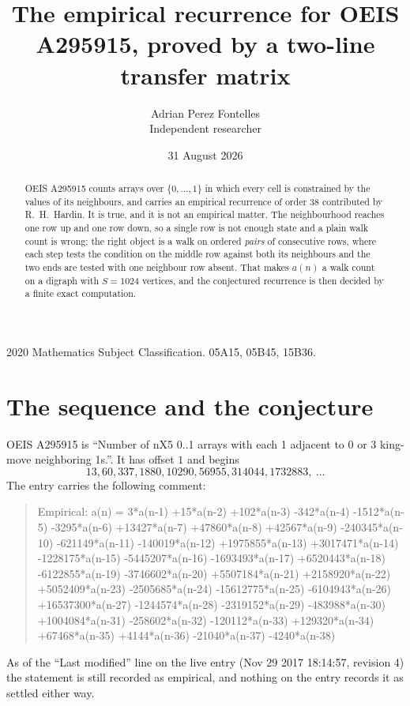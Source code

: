 \documentclass[11pt,a4paper]{article}
\title{The empirical recurrence for OEIS A295915, proved by a two-line transfer matrix}
\author{Adrian Perez Fontelles\\ \small Independent researcher}
\date{31 August 2026}
\theoremstyle{plain}
\theoremstyle{definition}
\begin{document}
\maketitle

\begin{abstract}
OEIS A295915 counts arrays over $\{0,\dots,1\}$ in which every cell is constrained by the
values of its neighbours, and carries an empirical recurrence of order $38$ contributed
by R.~H.~Hardin. It is true, and it is not an empirical matter. The neighbourhood reaches one
row up and one row down, so a single row is not enough state and a plain walk count
is wrong; the right object is a walk on ordered \emph{pairs} of consecutive rows, where
each step tests the condition on the middle row against both its neighbours and the two
ends are tested with one neighbour row absent. That makes $a(n)$ a walk count on a digraph
with $S=1024$ vertices, and the conjectured recurrence is then decided by a finite exact
computation.
\end{abstract}

\noindent\small 2020 Mathematics Subject Classification. 05A15, 05B45, 15B36.\normalsize

\section{The sequence and the conjecture}

OEIS A295915 is ``Number of nX5 0..1 arrays with each 1 adjacent to 0 or 3 king-move neighboring 1s.''. It has offset $1$ and begins
\[
13, 60, 337, 1880, 10290, 56955, 314044, 1732883,\ \dots
\]
The entry carries the following comment:
\begin{quote}\small
Empirical: a(n) = 3*a(n-1) +15*a(n-2) +102*a(n-3) -342*a(n-4) -1512*a(n-5) -3295*a(n-6) +13427*a(n-7) +47860*a(n-8) +42567*a(n-9) -240345*a(n-10) -621149*a(n-11) -140019*a(n-12) +1975855*a(n-13) +3017471*a(n-14) -1228175*a(n-15) -5445207*a(n-16) -1693493*a(n-17) +6520443*a(n-18) -6122855*a(n-19) -3746602*a(n-20) +5507184*a(n-21) +2158920*a(n-22) +5052409*a(n-23) -2505685*a(n-24) -15612775*a(n-25) -6104943*a(n-26) +16537300*a(n-27) -1244574*a(n-28) -2319152*a(n-29) -483988*a(n-30) +1004084*a(n-31) -258602*a(n-32) -120112*a(n-33) +129320*a(n-34) +67468*a(n-35) +4144*a(n-36) -21040*a(n-37) -4240*a(n-38)
\end{quote}
As of the ``Last modified'' line on the live entry (Nov 29 2017 18:14:57, revision 4) the statement is
still recorded as empirical, and nothing on the entry records it as settled either way.
\end{document}
